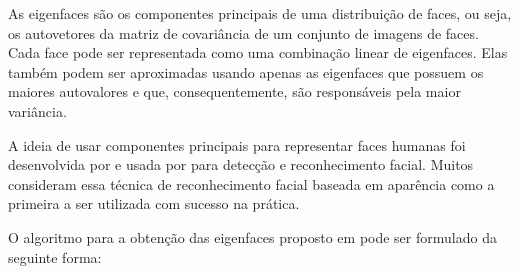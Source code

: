 As eigenfaces são os componentes principais de uma distribuição de faces, ou seja, os autovetores da matriz de covariância de um conjunto de imagens de faces.
Cada face pode ser representada como uma combinação linear de eigenfaces. Elas também podem ser aproximadas usando apenas as eigenfaces que possuem os maiores autovalores e que, consequentemente, são responsáveis pela maior variância.

A ideia de usar componentes principais para representar faces humanas foi desenvolvida por  e usada por \cite{turk1991eigenfaces} para detecção e reconhecimento facial.
Muitos consideram essa técnica de reconhecimento facial baseada em aparência como a primeira a ser utilizada com sucesso na prática.

O algoritmo para a obtenção das eigenfaces proposto em \cite{turk1991face} pode ser formulado da seguinte forma:

